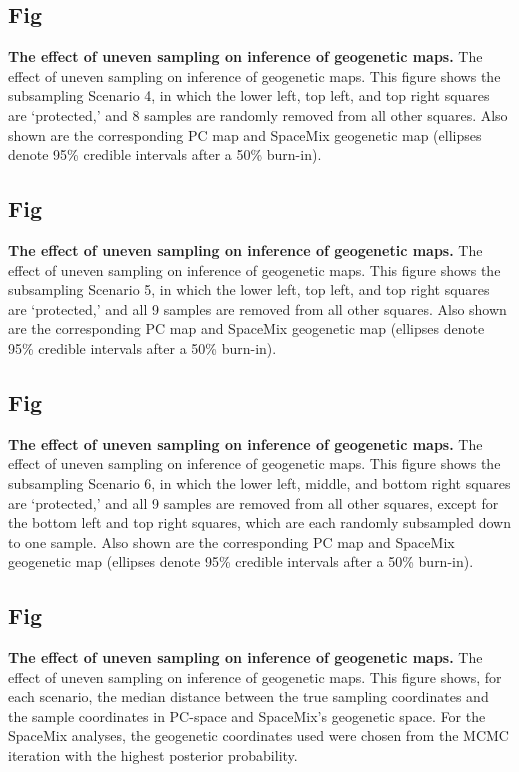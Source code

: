 \documentclass[10pt,letterpaper]{article}
\begin{document}
\subsection{Fig}	
\label{sfig:uneven_sampling_grid_subsamp4}
{\bf{
	The effect of uneven sampling on inference of geogenetic maps.}}
	The effect of uneven sampling on inference of geogenetic maps.  
	This figure shows the subsampling Scenario 4, 
	in which the lower left, top left, and top right squares are `protected,'
	and 8 samples are randomly removed from all other squares.
	Also shown are the corresponding PC map and 
	SpaceMix geogenetic map 
	(ellipses denote 95\% credible intervals after a 50\% burn-in).

\subsection{Fig}			
\label{sfig:uneven_sampling_grid_subsamp5}
{\bf{
	The effect of uneven sampling on inference of geogenetic maps.}}
	The effect of uneven sampling on inference of geogenetic maps.  
	This figure shows the subsampling Scenario 5, 
	in which the lower left, top left, and top right squares are `protected,'
	and all 9 samples are removed from all other squares.
	Also shown are the corresponding PC map and 
	SpaceMix geogenetic map 
	(ellipses denote 95\% credible intervals after a 50\% burn-in).

\subsection{Fig}			
\label{sfig:uneven_sampling_grid_subsamp_diag}
{\bf{
	The effect of uneven sampling on inference of geogenetic maps.}}
	The effect of uneven sampling on inference of geogenetic maps.  
	This figure shows the subsampling Scenario 6, 
	in which the lower left, middle, and bottom right squares are `protected,'
	and all 9 samples are removed from all other squares, 
	except for the bottom left and top right squares, which are each 
	randomly subsampled down to one sample.
	Also shown are the corresponding PC map and 
	SpaceMix geogenetic map 
	(ellipses denote 95\% credible intervals after a 50\% burn-in).

\subsection{Fig}			
\label{sfig:uneven_sampling_grid_med_dist}
{\bf{
	The effect of uneven sampling on inference of geogenetic maps.}}
	The effect of uneven sampling on inference of geogenetic maps.  
	This figure shows, for each scenario, the median distance 
	between the true sampling coordinates and the sample coordinates 
	in PC-space and SpaceMix's geogenetic space.  For the SpaceMix 
	analyses, the geogenetic coordinates used were chosen from the 
	MCMC iteration with the highest posterior probability.
\end{document}
